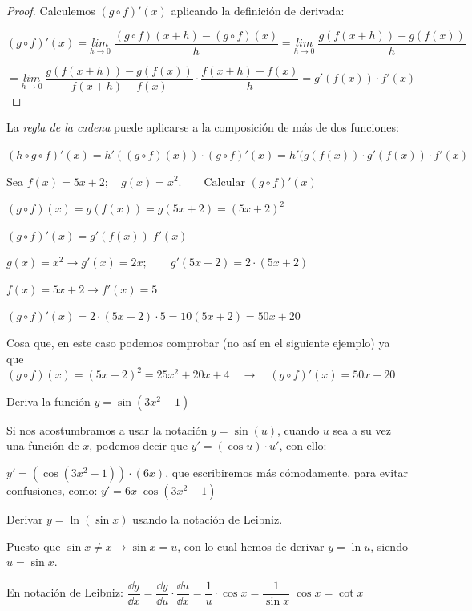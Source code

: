 	\begin{proof}Calculemos $(g\circ f)'(x)$ aplicando la definición de derivada:
	
	$(g\circ f)'(x)=\underset {h \to 0}{lim}\; {\dfrac {(g \circ f)(x+h)-(g\circ f)(x)}{h}}=\underset {h \to 0}{lim}\; {\dfrac {g\left(f(x+h)\right)-g\left(f(x)\right)}{h}}$
	
	$=\underset {h \to 0}{lim}\; { \dfrac {g\left(f(x+h)\right)-g\left(f(x)\right )}{f(x+h)-f(x)} \cdot \dfrac {f(x+h)-f(x)}{h}  }= g'(f(x))\cdot f'(x)$
		
	\end{proof}
	
	La \emph{regla de la cadena} puede aplicarse a la composición de más de dos funciones:
	
	
	$(h\circ g \circ f)'(x)= h'((g\circ f)(x))\cdot (g \circ f)'(x)=h'(g(f(x))\cdot g'(f(x))\cdot f'(x)$
	
	\begin{ejem} Sea $f(x)=5x+2; \quad g(x)=x^2.\qquad \mbox{Calcular } (g\circ f)'(x)$
	
	$(g\circ f)(x)=g(f(x))=g(5x+2)=(5x+2)^2$
	
	$(g \circ f)'(x)=g'(f(x))\; f'(x)$
	
	$g(x)=x^2 \to g'(x)=2x; \qquad g'(5x+2)=2\cdot (5x+2)$
	
	$f(x)=5x+2 \to f'(x)=5$
	
	$(g\circ f)'(x)= 2\cdot (5x+2) \cdot 5 = 10(5x+2)=50x+20$
	
	\textcolor{gris}{Cosa que, en este caso podemos comprobar (no así en el siguiente ejemplo) ya que $(g\circ f)(x)=(5x+2)^2=25x^2+20x+4 \quad \to \quad (g\circ f)'(x)=50x+20$}
		
	\end{ejem}
	
	\begin{ejem} Deriva la función $y=\sin(3x^2-1)$
	
	Si nos acostumbramos a usar la notación $y=\sin(u)$, cuando $u$ sea a su vez una función de $x$, podemos decir que $y'=(\cos u) \cdot u'$, con ello:
	
	$y'=(\cos(3x^2-1))  \cdot  (6x)$, que escribiremos más cómodamente, para evitar confusiones, como: $y'=6x \; \cos (3x^2-1)$
		
	\end{ejem} 
	
	
	\begin{ejem} Derivar $y=\ln(\sin x)$ usando la notación de Leibniz.
	
	Puesto que $\sin x \neq x \to \sin x=u$, con lo cual hemos de derivar $y=\ln u$, siendo $u=\sin x$.
	
	En notación de Leibniz: $\dfrac {\dd y}{\dd x}= \dfrac {\dd y}{\dd u} \cdot \dfrac {\dd u }{\dd x}= \dfrac 1 u \cdot \cos x= \dfrac 1 {\sin x}\; \cos x= \cot x$	
	\end{ejem}

